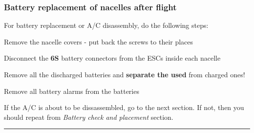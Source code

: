 	\subsubsection*{Battery replacement of nacelles after flight}\label{battery-replacement-after-flight}
	
	For battery replacement or A/C disassembly, do the following steps:
	
	\begin{todolist}
	\itemsep1pt\parskip0pt
	\item
	  Remove the nacelle covers - put back the screws to their places
	\item
	  Disconnect the \textbf{6S} battery connectors from the ESCs inside
	  each nacelle
	\item
	  Remove all the discharged batteries and \textbf{separate the used}
	  from charged ones!
	\item
	  Remove all battery alarms from the batteries
	\end{todolist}
	
	If the A/C is about to be dissassembled, go to the next section. If not,
	then you should repeat from \emph{Battery check and placement} section.
	
	\begin{center}\rule{3in}{0.4pt}\end{center}
	
